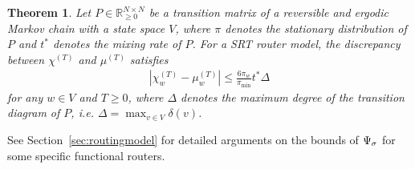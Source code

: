 \documentclass[letter, 11pt]{article}
\newcommand{\1}{\mbox{1}\hspace{-0.25em}\mbox{l}}
\newtheorem{theorem}{Theorem}[section]
\begin{document}
\begin{theorem}
\label{thm:mixupper-vertexgreedy}
 Let $P \in \mathbb{R}_{\geq 0}^{N \times N}$ be a transition matrix of 
  a reversible and ergodic Markov chain with a state space $V$, where $\pi$ denotes the stationary distribution of $P$ and $t^*$ denotes the mixing rate of $P$. 
For a SRT router model, the discrepancy between $\chi^{(T)}$ and $\mu^{(T)}$ satisfies
\begin{eqnarray*}
\left|\chi_w^{(T)}-\mu_w^{(T)}\right|
\leq \frac{6\pi_w}{\pi_{\min}} t^* \Delta
\end{eqnarray*}
for any $w\in V$ and $T\geq 0$, where $\Delta$ denotes the maximum degree of the transition diagram of $P$, {\rm i.e.} $\Delta=\max_{v\in V}\delta(v)$. 
\end{theorem}


See Section~\ref{sec:routingmodel} for detailed arguments on the bounds of $\Psi_\sigma$ for some specific functional routers. 
\end{document}
